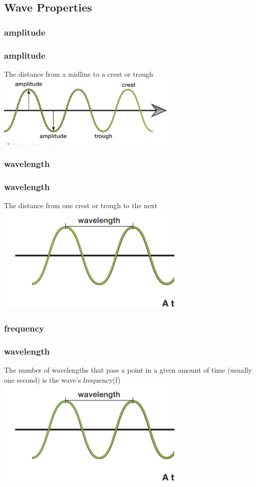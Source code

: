 \documentclass{beamer}
\begin{document}
\subsection{Wave Properties}

\subsubsection{amplitude}

\begin{frame}
    \frametitle{amplitude}
    \pause The distance from a midline to a crest or trough
    \includegraphics[width=9cm]{../../../../public/amplitude.png}
\end{frame}

\subsubsection{wavelength}

\begin{frame}
    \frametitle{wavelength}
    \pause The distance from one crest or trough to the next
    \includegraphics[width=9cm]{../../../../public/wavelength.png}
\end{frame}

\subsubsection{frequency}

\begin{frame}
    \frametitle{wavelength}
    \pause  The number of wavelengths that pass a point in a given amount of time (usually one second) is the wave's frequency(f)
    \includegraphics[width=9cm]{../../../../public/wavelength.png}
\end{frame}
\end{document}
